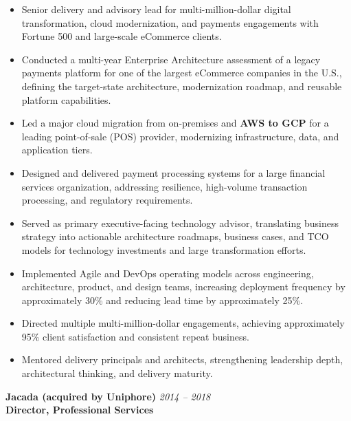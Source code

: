 \documentclass[11pt]{article}
\begin{document}
\begin{itemize}
  \item Senior delivery and advisory lead for multi-million-dollar digital transformation, cloud modernization, and payments engagements with Fortune 500 and large-scale eCommerce clients.
  \item Conducted a multi-year Enterprise Architecture assessment of a legacy payments platform for one of the largest eCommerce companies in the U.S., defining the target-state architecture, modernization roadmap, and reusable platform capabilities.
  \item Led a major cloud migration from on-premises and \textbf{AWS to GCP} for a leading point-of-sale (POS) provider, modernizing infrastructure, data, and application tiers.
  \item Designed and delivered payment processing systems for a large financial services organization, addressing resilience, high-volume transaction processing, and regulatory requirements.
  \item Served as primary executive-facing technology advisor, translating business strategy into actionable architecture roadmaps, business cases, and TCO models for technology investments and large transformation efforts.
  \item Implemented Agile and DevOps operating models across engineering, architecture, product, and design teams, increasing deployment frequency by approximately 30\% and reducing lead time by approximately 25\%.
  \item Directed multiple multi-million-dollar engagements, achieving approximately 95\% client satisfaction and consistent repeat business.
  \item Mentored delivery principals and architects, strengthening leadership depth, architectural thinking, and delivery maturity.
\end{itemize}

\vspace{6pt}

\textbf{Jacada (acquired by Uniphore)} \hfill \textit{2014 -- 2018} \\
\textbf{Director, Professional Services}
\end{document}

